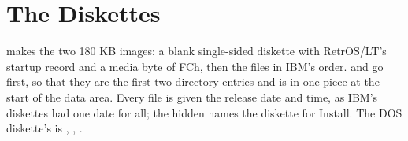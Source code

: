 \section{The Diskettes}

 makes the two 180 KB images: a blank
single-sided diskette with RetrOS/LT's startup record and a media byte of
FCh, then the files in IBM's order.  and
 go first, so that they are the first two directory
entries and  is in one piece at the start of the data
area. Every file is given the release date and time, as IBM's diskettes
had one date for all; the hidden  names the diskette for
Install. The DOS diskette's  is ,
, .
